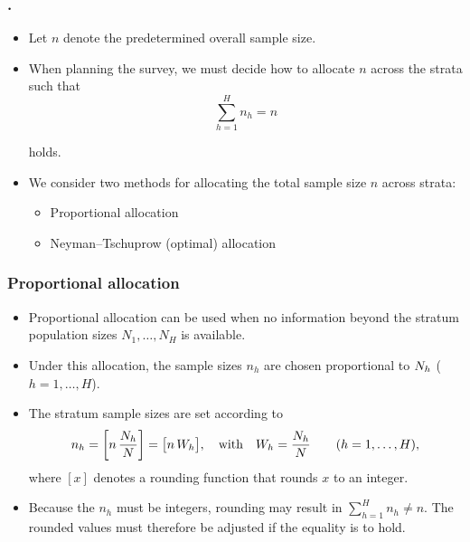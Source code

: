 \documentclass{my_eth_beamer}
\numberwithin{equation}{section}
\begin{document}
\begin{frame}
    \frametitle{\insertsectionnumber.\insertsubsectionnumber~\insertsubsection}
    \begin{itemize}
    \setlength{\itemsep}{10pt}
        \item Let $n$ denote the \alert{predetermined} overall sample size.
        \item When \alert{planning} the survey, we must decide how to
            \alert{allocate} $n$ across the strata such that
            \begin{equation*}
                \sum_{h=1}^H n_h = n
            \end{equation*}

            \vspace{-0.5em}

            \noindent holds.

        \item We consider two methods for \alert{allocating} the total sample
            size $n$ across strata:
            \vspace{0.25em}
            \begin{itemize}
            \setlength{\itemsep}{6pt}
                \item \alert{Proportional} allocation
                \item \alert{Neyman--Tschuprow} (optimal) allocation
            \end{itemize}
    \end{itemize}
\end{frame}

\begin{frame}
    \frametitle{\normalsize Proportional allocation}
    \begin{itemize}
    \setlength{\itemsep}{8pt}
        \item Proportional allocation can be used when \alert{no information
            beyond} the stratum population sizes $N_1, \ldots, N_H$ is
            available.
        \item Under this allocation, the sample sizes $n_h$ are chosen
            \alert{proportional} to $N_{h}$ ($h = 1, \ldots, H$).
        \item The stratum sample sizes are set according to
            \begin{equation*}
                n_h = \left[n\, \frac{N_{h}}{N} \right] =
                    \big[n \, W_h \big], \quad \text{with}
                        \quad W_h = \frac{N_{h}}{N} \qquad (h = 1, \ldots, H),
            \end{equation*}
            \noindent where $[x]$ denotes a \alert{rounding function} that
            rounds $x$ to an integer.
        \item Because the $n_h$ must be integers, rounding may result in
            $\sum_{h=1}^H n_h \neq n$. The rounded values must therefore be
            adjusted if the equality is to hold.
    \end{itemize}
\end{frame}
\end{document}

